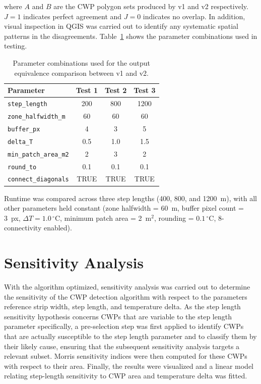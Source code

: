 where $A$ and $B$ are the CWP polygon sets produced by v1 and v2 respectively. 
$J = 1$ indicates perfect agreement and $J = 0$ indicates no overlap. In 
addition, visual inspection in QGIS was carried out to identify any systematic 
spatial patterns in the disagreements. Table~\ref{tab:validation_params} shows 
the parameter combinations used in testing.


\begin{table}[H]
	\centering
	\caption{Parameter combinations used for the output equivalence comparison 
		between v1 and v2.}
	\label{tab:validation_params}
	\begin{tabular}{@{}l c c c@{}}
		\toprule
		\textbf{Parameter} & \textbf{Test 1} & \textbf{Test 2} & \textbf{Test 3} \\
		\midrule
		\texttt{step\_length}         & 200  & 800  & 1200 \\
		\texttt{zone\_halfwidth\_m}   & 60   & 60   & 60   \\
		\texttt{buffer\_px}           & 4    & 3    & 5    \\
		\texttt{delta\_T}             & 0.5  & 1.0  & 1.5  \\
		\texttt{min\_patch\_area\_m2} & 2    & 3    & 2    \\
		\texttt{round\_to}            & 0.1  & 0.1  & 0.1  \\
		\texttt{connect\_diagonals}   & TRUE & TRUE & TRUE \\
		\bottomrule
	\end{tabular}
\end{table}

Runtime was compared across three step lengths (400, 800, and 1200~m), with 
all other parameters held constant (zone halfwidth = 60~m, buffer pixel 
count = 3~px, $\Delta T = 1.0\,^{\circ}$C, minimum patch area = 2~m$^2$, 
rounding = $0.1\,^{\circ}$C, 8-connectivity enabled).

\section{Sensitivity Analysis}
\label{sec:rq2_methods}

With the algorithm optimized, sensitivity analysis was carried out to determine 
the sensitivity of the CWP detection algorithm with respect to the parameters 
reference strip width, step length, and temperature delta. As the step length 
sensitivity hypothesis concerns CWPs that are variable to the step length parameter specifically, a 
pre-selection step was first applied to identify CWPs that are actually 
susceptible to the step length parameter and to classify them by their 
likely cause, ensuring that the subsequent sensitivity analysis targets a 
relevant subset. Morris sensitivity indices were then computed 
for these CWPs with respect to their area. Finally, the results were visualized 
and a linear model relating step-length sensitivity to CWP area and temperature 
delta was fitted.

